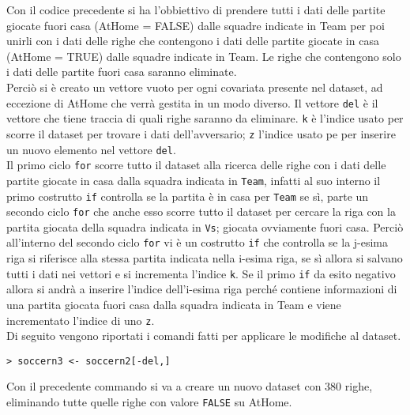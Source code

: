 Con il codice precedente si ha l'obbiettivo di prendere tutti i dati delle partite giocate fuori casa (\textsf{AtHome} = FALSE) dalle squadre indicate in \textsf{Team} per poi unirli con i dati delle righe che contengono i dati delle partite giocate in casa (\textsf{AtHome} = TRUE) dalle squadre indicate in \textsf{Team}. Le righe che contengono solo i dati delle partite fuori casa saranno eliminate.\\
Perciò si è creato un vettore vuoto per ogni covariata presente nel dataset, ad eccezione di \textsf{AtHome} che verrà gestita in un modo diverso. Il vettore \texttt{del} è il vettore che tiene traccia di quali righe saranno da eliminare. \texttt{k} è l'indice usato per scorre il dataset per trovare i dati dell'avversario; \texttt{z} l'indice usato pe per inserire un nuovo elemento nel vettore \texttt{del}.\\
Il primo ciclo \texttt{for} scorre tutto il dataset alla ricerca delle righe con i dati delle partite giocate in casa dalla squadra indicata in \texttt{Team}, infatti al suo interno il primo costrutto \texttt{if} controlla se la partita è in casa per \texttt{Team} se sì, parte un secondo ciclo \texttt{for} che anche esso scorre tutto il dataset per cercare la riga con la partita giocata della squadra indicata in \texttt{Vs}; giocata ovviamente fuori casa. Perciò all'interno del secondo ciclo \texttt{for} vi è un costrutto \texttt{if} che controlla se la j-esima riga si riferisce alla stessa partita indicata nella i-esima riga, se sì allora si salvano tutti i dati nei vettori e si incrementa l'indice \texttt{k}. Se il primo \texttt{if} da esito negativo allora si andrà a inserire l'indice dell'i-esima riga perché contiene informazioni di una partita giocata fuori casa dalla squadra indicata in \textsf{Team} e viene incrementato l'indice di uno \texttt{z}.\\

Di seguito vengono riportati i comandi fatti per applicare le modifiche al dataset.

\begin{lstlisting}
> soccern3 <- soccern2[-del,]
\end{lstlisting}

Con il precedente commando si va a creare un nuovo dataset con 380 righe, eliminando tutte quelle righe con valore \texttt{FALSE} su \textsf{AtHome}. 

